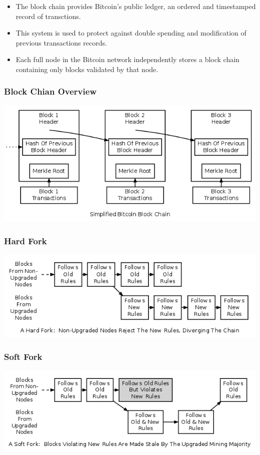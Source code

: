 \begin{frame}
    \begin{itemize}
        \item The block chain provides Bitcoin's public ledger, an ordered and timestamped record of transctions.
        \item This system is used to protect against double spending and modification of previous transactions records.
        \item Each full node in the Bitcoin network independently stores a block chain containing only blocks validated by that node.
    \end{itemize}
\end{frame}

\begin{frame}
    \frametitle{Block Chian Overview}
    \includegraphics[scale=0.4]{./figures/en-blockchain-overview.png}
\end{frame}

\begin{frame}
    \frametitle{Hard Fork}
    \includegraphics[scale=0.4]{./figures/en-hard-fork.png}
\end{frame}

\begin{frame}
    \frametitle{Soft Fork}
    \includegraphics[scale=0.4]{./figures/en-soft-fork.png}
\end{frame}
